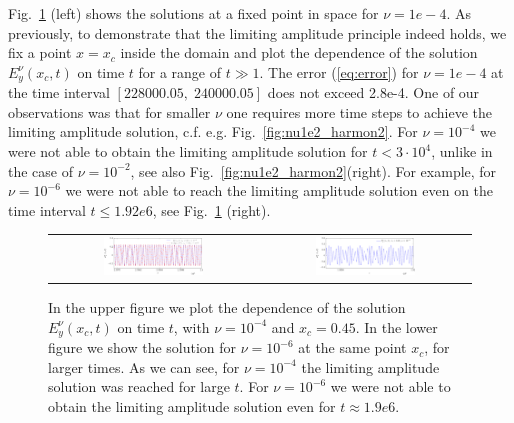 Fig.~\ref{fig:nu1e4_harmon} (left) shows the solutions at a fixed point in space for $\nu=1e-4$. As previously, 
to demonstrate that the limiting amplitude principle indeed holds, we fix a point $x=x_c$ 
inside the domain and plot 
the dependence of the solution $E_{y}^{\nu}(x_c,t)$ on time $t$ for a range of $t\gg 1$. 
The error (\ref{eq:error}) for $\nu=1e-4$ at the time interval $[228000.05,\; 240000.05]$ does not exceed 2.8e-4. 
One of our observations was that for smaller $\nu$ one requires more time steps to achieve the limiting amplitude solution, 
c.f. e.g. Fig.~\ref{fig:nu1e2_harmon2}. 
For $\nu=10^{-4}$ we were not able to obtain the limiting amplitude solution for $t<3\cdot 10^{4}$, unlike in the case of $\nu=10^{-2}$, 
see also Fig.~\ref{fig:nu1e2_harmon2}(right). 
For example, for $\nu=10^{-6}$ we were not able to reach the limiting amplitude solution even on the time interval $t\leq 1.92e6$, 
see Fig.~\ref{fig:nu1e4_harmon} (right). 
\begin{figure}
\begin{tabular}{cc}
 \includegraphics[width=0.5\textwidth]{airy/figure_nu1e4-crop.pdf}&
 \includegraphics[width=0.5\textwidth]{airy/figure_nu1e6-crop.pdf}\\
\end{tabular}
\caption{In the upper figure we plot the dependence of the solution $E_{y}^{\nu}(x_c,t)$ on time $t$, with $\nu=10^{-4}$ and $x_c=0.45$. 
In the lower figure we show the solution for $\nu=10^{-6}$ at the same point $x_c$, for larger times. As we can see, for 
$\nu=10^{-4}$ the limiting amplitude solution was reached for large $t$. For $\nu=10^{-6}$ we were not able 
to obtain the limiting amplitude solution even for $t\approx 1.9e6$. }
  \label{fig:nu1e4_harmon}
\end{figure}

